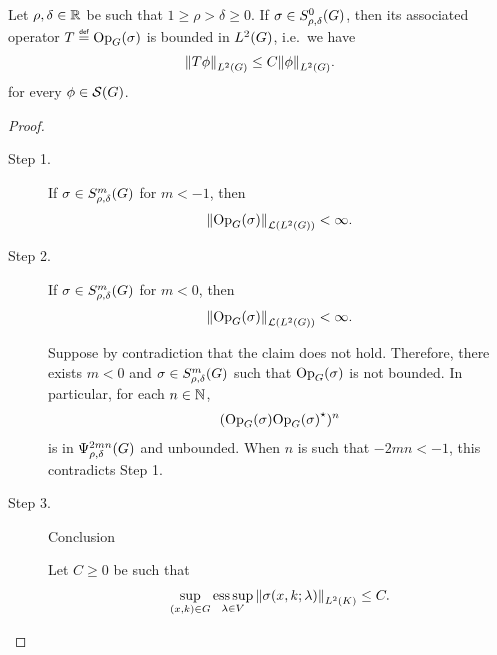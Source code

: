 \begin{proposition}[$L^2$ boundedness]
\label{proposition:L2_boundedness}
    Let $\rho, \delta \in \R$ be such that $1 \geq \rho > \delta \geq 0$.
    If $\sigma \in \SymbolClass 0 {\rho, \delta}$,
    then its associated operator $T \defeq \Op(\sigma)$ is bounded in $\Lebesgue 2 \Group$,
    i.e.\ we have
    \begin{align*}
        \norm [\Lebesgue 2 \Group] {T \phi} \leq C \norm [\Lebesgue 2 \Group] \phi.
    \end{align*}
    for every $\phi \in \Schwartz \Group$.
\end{proposition}
\begin{proof}
    \begin{description}
        \item[Step 1.] If $\sigma \in \SymbolClass m {\rho, \delta}$ for $m < -1$, then
            \begin{align*}
                \norm [\Lin{\Lebesgue 2 \Group}] {\Op(\sigma)} < \infty.
            \end{align*}
        \item[Step 2.] If $\sigma \in \SymbolClass m {\rho, \delta}$ for $m < 0$, then
            \begin{align*}
                \norm [\Lin{\Lebesgue 2 \Group}] {\Op(\sigma)} < \infty.
            \end{align*}

            Suppose by contradiction that the claim does not hold.
            Therefore, there exists $m < 0$ and $\sigma \in \SymbolClass m {\rho, \delta}$ such that
            $\Op(\sigma)$ is not bounded.
            In particular, for each $n \in \N$,
            \begin{align*}
                (\Op(\sigma) \adj {\Op(\sigma)})^n
            \end{align*}
            is in $\OperatorClass {2 m n} {\rho, \delta}$ and unbounded.
            When $n$ is such that $-2 m n < -1$, this contradicts Step 1.
        \item[Step 3.] Conclusion

            Let $C \geq 0$ be such that
            \begin{align*}
                \sup_{(x, k) \in \Group} \esssup_{\lambda \in \VectorSpace} \norm [\Lebesgue 2 \CompactGroup] {\sigma(x, k; \lambda)} \leq C.
            \end{align*}


\end{description}
\end{proof}
